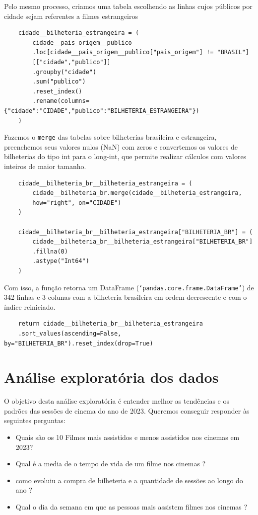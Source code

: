 \documentclass[12pt, a4paper]{article}
\begin{document}
Pelo mesmo processo, criamos uma tabela escolhendo as linhas cujos públicos por cidade sejam referentes a filmes estrangeiros
\begin{verbatim}
    cidade__bilheteria_estrangeira = (
        cidade__pais_origem__publico
        .loc[cidade__pais_origem__publico["pais_origem"] != "BRASIL"]
        [["cidade","publico"]]
        .groupby("cidade")
        .sum("publico")
        .reset_index()
        .rename(columns={"cidade":"CIDADE","publico":"BILHETERIA_ESTRANGEIRA"})
    )
\end{verbatim}
Fazemos o \texttt{merge} das tabelas sobre bilheterias brasileira e estrangeira, preenchemos seus valores nulos (NaN) com zeros e convertemos os valores de bilheterias do tipo int para o long-int, que permite realizar cálculos com valores inteiros de maior tamanho.
\begin{verbatim}
    cidade__bilheteria_br__bilheteria_estrangeira = (
        cidade__bilheteria_br.merge(cidade__bilheteria_estrangeira, 
        how="right", on="CIDADE")
    )

    cidade__bilheteria_br__bilheteria_estrangeira["BILHETERIA_BR"] = (
        cidade__bilheteria_br__bilheteria_estrangeira["BILHETERIA_BR"]
        .fillna(0)
        .astype("Int64")
    )
\end{verbatim}

Com isso, a função retorna um DataFrame (\texttt{`pandas.core.frame.DataFrame'}) de 342 linhas e 3 colunas com a bilheteria brasileira em ordem decrescente e com o índice reiniciado.
\begin{verbatim}
    return cidade__bilheteria_br__bilheteria_estrangeira
    .sort_values(ascending=False, by="BILHETERIA_BR").reset_index(drop=True)
\end{verbatim}

\newpage

\section{Análise exploratória dos dados}

O objetivo desta análise exploratória é entender melhor as tendências e os padrões das sessões de cinema do ano de 2023. Queremos conseguir responder às seguintes perguntas:

\begin{itemize}
    \item Quais são os 10 Filmes mais assistidos e menos assistidos nos cinemas em 2023?
    \item Qual é a media de o tempo de vida de um filme nos cinemas ?
    \item como evoluiu a compra de bilheteria e a quantidade de sessões ao longo do ano ? 
    \item Qual o dia da semana em que as pessoas mais assistem filmes nos cinemas ?
\end{itemize}
\end{document}
